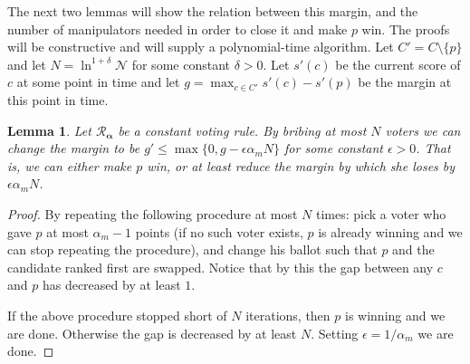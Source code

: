 \documentclass[letterpaper]{article} %
\newtheorem{lemma}[theorem]{Lemma}
\theoremstyle{definition}
\newcommand{\abs}[1]{\lvert #1 \rvert}
\newcommand{\NN}{\mathcal{N}}
\newcommand\vecgreek{\bm}
\newcommand{\veca}{\vecgreek{\alpha}}
\newcommand{\Ra}{\mathcal{R}_{\veca}}
\begin{document}
The next two lemmas will show the relation between this margin, and the number of manipulators needed in order to close it and make $p$ win. The proofs will be constructive and will supply a polynomial-time algorithm. Let $C'=C \setminus \{p\}$ and let $N=\ln ^{1+\delta} \NN$ for some constant $\delta>0$. Let $s'(c)$ be the current score of $c$ at some point in time and let $g = \max_{c \in C' }s'(c)-s'(p)$ be the margin at this point in time.

\begin{lemma}\label{lem:how-to-bribe2}
	Let $\Ra$ be a constant voting rule. By bribing at most $N$ voters we can change the margin to be $g' \leq \max\{0, g - \epsilon\alpha_m N\}$ for some constant $\epsilon>0$. That is, we can either make $p$ win, or at least reduce the margin by which she loses by $\epsilon \alpha_m N$.
\end{lemma}
\begin{proof}
	By repeating the following procedure at most $N$ times: pick a voter who gave $p$ at most $\alpha_m-1 $ points (if no such voter exists, $p$ is already winning and we can stop repeating the procedure), and change his ballot such that $p$ and the candidate ranked first are swapped. Notice that by this the gap between any $c$ and $p$ has decreased by at least $1$.

	If the above procedure stopped short of $N$ iterations, then $p$ is winning and we are done. Otherwise the gap is decreased by at least $N$. Setting $\epsilon=1/\alpha_m$ we are done.
\end{proof}


%
\end{document}
